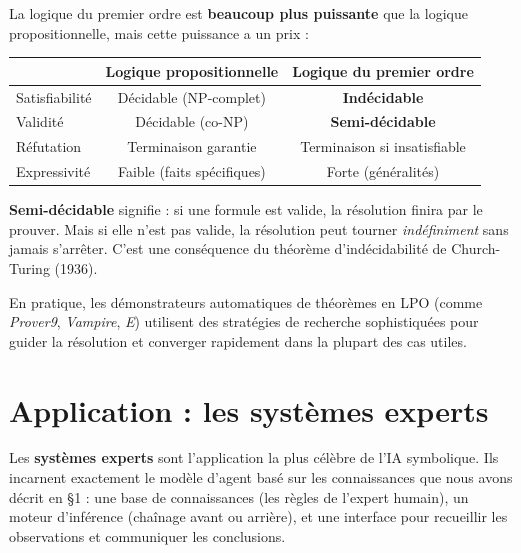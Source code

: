 \documentclass[11pt,a4paper]{article}
\begin{document}
\begin{attentionbox}
La logique du premier ordre est \textbf{beaucoup plus puissante} que la logique propositionnelle, mais cette puissance a un prix :

\begin{center}
\begin{tabular}{lcc}
\toprule
& \textbf{Logique propositionnelle} & \textbf{Logique du premier ordre} \\
\midrule
Satisfiabilité & Décidable (NP-complet) & \textbf{Indécidable} \\
Validité & Décidable (co-NP) & \textbf{Semi-décidable} \\
Réfutation & Terminaison garantie & Terminaison si insatisfiable \\
Expressivité & Faible (faits spécifiques) & Forte (généralités) \\
\bottomrule
\end{tabular}
\end{center}

\textbf{Semi-décidable} signifie : si une formule est valide, la résolution finira par le prouver. Mais si elle n'est pas valide, la résolution peut tourner \textit{indéfiniment} sans jamais s'arrêter. C'est une conséquence du théorème d'indécidabilité de Church-Turing (1936).

En pratique, les démonstrateurs automatiques de théorèmes en LPO (comme \textit{Prover9}, \textit{Vampire}, \textit{E}) utilisent des stratégies de recherche sophistiquées pour guider la résolution et converger rapidement dans la plupart des cas utiles.
\end{attentionbox}

\section{Application : les systèmes experts}

Les \textbf{systèmes experts} sont l'application la plus célèbre de l'IA symbolique. Ils incarnent exactement le modèle d'agent basé sur les connaissances que nous avons décrit en §1 : une base de connaissances (les règles de l'expert humain), un moteur d'inférence (chaînage avant ou arrière), et une interface pour recueillir les observations et communiquer les conclusions.
\end{document}

